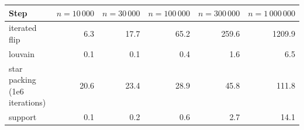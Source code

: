 \begin{tabular}{lrrrrr}
\toprule
Step & $n=10\,000$ & $n=30\,000$ & $n=100\,000$ & $n=300\,000$ & $n=1\,000\,000$\\
\midrule
iterated flip & 6.3 & 17.7 & 65.2 & 259.6 & 1209.9\\
louvain & 0.1 & 0.1 & 0.4 & 1.6 & 6.5\\
star packing (1e6 iterations) & 20.6 & 23.4 & 28.9 & 45.8 & 111.8\\
support & 0.1 & 0.2 & 0.6 & 2.7 & 14.1\\
\bottomrule
\end{tabular}
